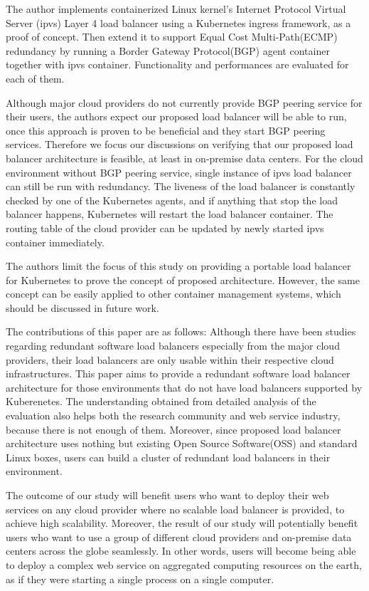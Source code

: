 The author implements containerized Linux kernel's Internet Protocol Virtual Server (ipvs)\cite{Zhang2000} Layer 4 load balancer using a Kubernetes ingress\cite{K8sIngress2017} framework, as a proof of concept.
Then extend it to support Equal Cost Multi-Path(ECMP)\cite{thaler2000multipath} redundancy by running a Border Gateway Protocol(BGP) agent container together with ipvs container.
Functionality and performances are evaluated for each of them.

Although major cloud providers do not currently provide BGP peering service for their users, the authors expect our proposed load balancer will be able to run, once this approach is proven to be beneficial and they start BGP peering services.
Therefore we focus our discussions on verifying that our proposed load balancer architecture is feasible, at least in on-premise data centers.
For the cloud environment without BGP peering service, single instance of ipvs load balancer can still be run with redundancy.
The liveness of the load balancer is constantly checked by one of the Kubernetes agents, and if anything that stop the load balancer happens, Kubernetes will restart the load balancer container.
The routing table of the cloud provider can be updated by newly started ipvs container immediately.

The authors limit the focus of this study on providing a portable load balancer for Kubernetes to prove the concept of proposed architecture.
However, the same concept can be easily applied to other container management systems, which should be discussed in future work.

The contributions of this paper are as follows:
Although there have been studies regarding redundant software load balancers especially from the major cloud providers\cite{eisenbud2016maglev,patel2013ananta}, their load balancers are only usable within their respective cloud infrastructures.
This paper aims to provide a redundant software load balancer architecture for those environments that do not have load balancers supported by Kuberenetes.
The understanding obtained from detailed analysis of the evaluation also helps both the research community and web service industry, because there is not enough of them.
Moreover, since proposed load balancer architecture uses nothing but existing Open Source Software(OSS) and standard Linux boxes, users can build a cluster of redundant load balancers in their environment.

The outcome of our study will benefit users who want to deploy their web services on any cloud provider where no scalable load balancer is provided, to achieve high scalability.
Moreover, the result of our study will potentially benefit users who want to use a group of different cloud providers and on-premise data centers across the globe seamlessly.
In other words, users will become being able to deploy a complex web service on aggregated computing resources on the earth, as if they were starting a single process on a single computer.

